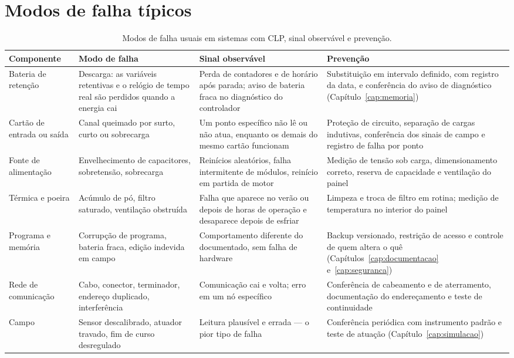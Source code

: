 \section{Modos de falha típicos}

\begin{table}[H]
  \centering
  \caption{Modos de falha usuais em sistemas com CLP, sinal observável e prevenção.}
  \label{tab:modos-falha}
  \begin{tabular}{p{3.2cm} p{4.6cm} p{3.2cm} p{3.3cm}}
    \toprule
    Componente & Modo de falha & Sinal observável & Prevenção \\
    \midrule
    Bateria de retenção
      & Descarga: as variáveis retentivas e o relógio de tempo real são perdidos quando a energia cai
      & Perda de contadores e de horário após parada; aviso de bateria fraca no diagnóstico do
        controlador
      & Substituição em intervalo definido, com registro da data, e conferência do aviso de
        diagnóstico (Capítulo~\ref{cap:memoria}) \\
    \addlinespace
    Cartão de entrada ou saída
      & Canal queimado por surto, curto ou sobrecarga
      & Um ponto específico não lê ou não atua, enquanto os demais do mesmo cartão funcionam
      & Proteção de circuito, separação de cargas indutivas, conferência dos sinais de campo e
        registro de falha por ponto \\
    \addlinespace
    Fonte de alimentação
      & Envelhecimento de capacitores, sobretensão, sobrecarga
      & Reinícios aleatórios, falha intermitente de módulos, reinício em partida de motor
      & Medição de tensão sob carga, dimensionamento correto, reserva de capacidade e ventilação do
        painel \\
    \addlinespace
    Térmica e poeira
      & Acúmulo de pó, filtro saturado, ventilação obstruída
      & Falha que aparece no verão ou depois de horas de operação e desaparece depois de esfriar
      & Limpeza e troca de filtro em rotina; medição de temperatura no interior do painel \\
    \addlinespace
    Programa e memória
      & Corrupção de programa, bateria fraca, edição indevida em campo
      & Comportamento diferente do documentado, sem falha de hardware
      & Backup versionado, restrição de acesso e controle de quem altera o quê
        (Capítulos~\ref{cap:documentacao} e~\ref{cap:seguranca}) \\
    \addlinespace
    Rede de comunicação
      & Cabo, conector, terminador, endereço duplicado, interferência
      & Comunicação cai e volta; erro em um nó específico
      & Conferência de cabeamento e de aterramento, documentação do endereçamento e teste de
        continuidade \\
    \addlinespace
    Campo
      & Sensor descalibrado, atuador travado, fim de curso desregulado
      & Leitura plausível e errada --- o pior tipo de falha
      & Conferência periódica com instrumento padrão e teste de atuação
        (Capítulo~\ref{cap:simulacao}) \\
    \bottomrule
  \end{tabular}
\end{table}

